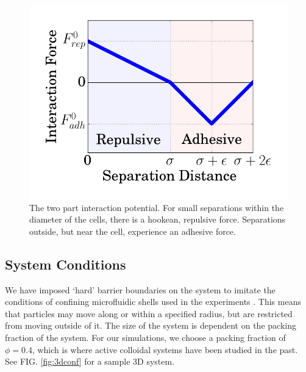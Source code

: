 \documentclass[aps,prb,twocolumn,groupedaddress,nofootinbib,floatfix]{revtex4}
\begin{document}
\begin{figure}
  \includegraphics[width=1.0\columnwidth]{interaction.png}
  \caption[capsuleECM]{The two part interaction potential. For small separations
    within the diameter of the cells, there is a hookean, repulsive force. Separations
    outside, but near the cell, experience an adhesive force.}
   \label{fig:interaction}
\end{figure}


\subsection*{System Conditions}
We have imposed `hard' barrier boundaries on the system to imitate the conditions
of confining microfluidic shells used in the experiments \cite{mingming}. This means that particles may move along or within a
specified radius, but are restricted from moving outside of it. 
The size of the system is dependent on the packing fraction of the system. 
For our simulations, we choose a packing fraction of $\phi=0.4$, which is where 
active colloidal systems have been studied in the past\cite{RednerBaskaran}.
See FIG. \ref{fig:3dconf} for a sample 3D system.
\end{document}
